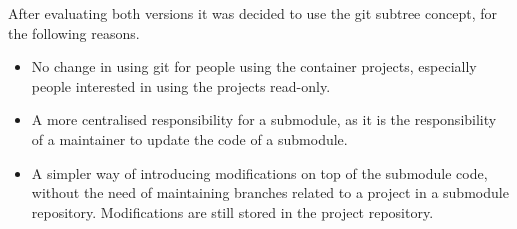 \documentclass{scrartcl}
\begin{document}
After evaluating both versions it was decided to use the git subtree
concept, for the following reasons.

\begin{itemize}
\item No change in using git for people using the container projects,
  especially people interested in using the projects read-only.
\item A more centralised responsibility for a submodule, as it is the
  responsibility of a maintainer to update the code of a submodule.
\item A simpler way of introducing modifications on top of the
  submodule code, without the need of maintaining branches related to
  a project in a submodule repository. Modifications are still stored
  in the project repository.
\end{itemize}
\end{document}

